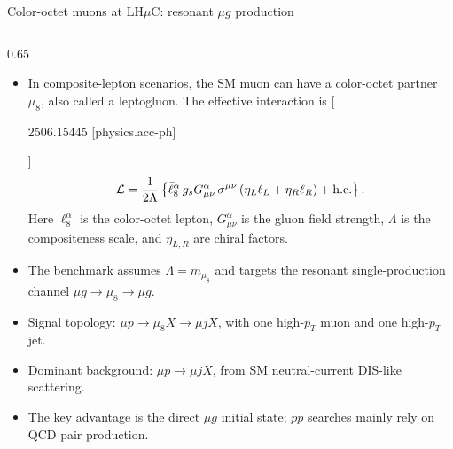 \documentclass[aspectratio=1610,english]{beamer}
\newcommand{\LHCmu}{LH$\mu$C}
\begin{document}
\begin{frame}{Color-octet muons at \texorpdfstring{\LHCmu{}}{LHmuC}: resonant \(\mu g\) production}
	
\vspace{-0.25em}
	
\begin{columns}[T]%
		
\begin{column}{0.65\textwidth}
			
\begin{itemize}
\scriptsize
\justifying
\item In composite-lepton scenarios, the SM muon can have a color-octet partner
\(\mu_8\), also called a leptogluon.  The effective interaction is 
[{\centering
	\tiny
	{\setlength{\fboxsep}{4pt}\colorbox{magenta!10}{\strut2506.15445 [physics.acc-ph]}}}]
				\[
				\mathcal{L}
				=
				\frac{1}{2\Lambda}
				\left\{
				\bar{\ell}^{\alpha}_{8}\,
				g_s G^{\alpha}_{\mu\nu}\,
				\sigma^{\mu\nu}
				\left(\eta_L \ell_L+\eta_R \ell_R\right)
				+{\rm h.c.}
				\right\}.
				\]
Here \(\ell^\alpha_8\) is the color-octet lepton, \(G^\alpha_{\mu\nu}\) is the
gluon field strength, \(\Lambda\) is the compositeness scale, and
\(\eta_{L,R}\) are chiral factors.
\end{itemize}

\vspace{0.15em}

\begin{itemize}
\scriptsize
\justifying
\item The benchmark assumes \(\Lambda=m_{\mu_8}\) and targets the resonant
single-production channel  $\mu g\to\mu_8\to\mu g$.

\item Signal topology: $\mu p\to \mu_8 X\to \mu j X$, with one high-\(p_T\) muon and one high-\(p_T\) jet.

\item Dominant background: $\mu p\to \mu j X$, from SM neutral-current DIS-like scattering.

\item The key advantage is the direct \(\mu g\) initial state; \(pp\) searches mainly rely on QCD pair production.
\end{itemize}



\end{column}
\end{columns}
\end{frame}
\end{document}
